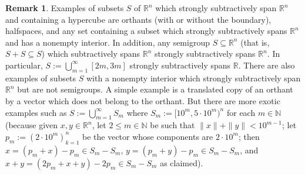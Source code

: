 \documentclass[12 pt]{amsart}
\theoremstyle{definition}
\newtheorem{remark}[thm]{Remark}
\newcommand{\R}{\mathbb{R}}
\newcommand{\N}{\mathbb{N}}
\begin{document}
\begin{remark}\label{rem:RestrictedCauchy}
Examples of subsets $S$ of $\R^n$ which strongly subtractively span $\R^n$ and containing a  
hypercube are orthants (with or without the boundary), 
halfspaces, and any set containing a subset which strongly subtractively spans $\R^n$ and has a nonempty 
interior. 
In addition, any semigroup $S\subseteq \R^n$ (that is, $S+S\subseteq S$) 
which subtractively spans $\R^n$  strongly subtractively spans $\R^n$. 
In particular, $S:=\bigcup_{m=1}^{\infty}[2m,3m]$ 
strongly subtractively spans $\R$. There are also examples of subsets $S$ with 
a nonempty interior which strongly subtractively span $\R^n$ but are not semigroups. A simple example is a translated copy of an orthant by a vector 
which does not belong to the orthant. But there are more exotic examples such as $S:=\bigcup_{m=1}^{\infty}S_m$ 
where $S_m:=[10^m,5\cdot 10^m)^n$ for each $m\in\N$ (because given $x,y\in \R^n$, let $2\leq m\in\N$ 
be such that $\|x\|+\|y\|<10^{m-1}$; let $p_m:=(2\cdot 10^{m})_{k=1}^n$ be the 
 vector whose components are $2\cdot 10^{m}$; 
 then $x=(p_m+x)-p_m\in S_m-S_m$, $y=(p_m+y)-p_m\in S_m-S_m$, and  $x+y=(2p_m+x+y)-2p_m\in S_m-S_m$ 
 as claimed). 
\end{remark}
\end{document}
